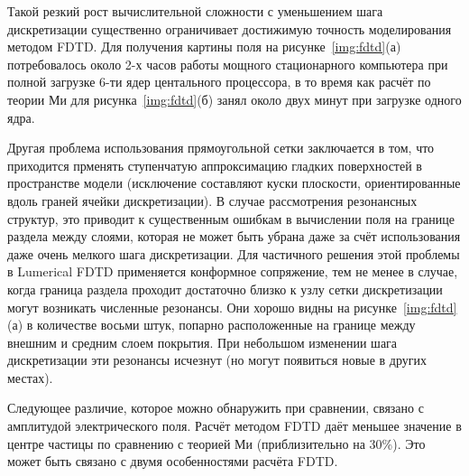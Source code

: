 Такой резкий рост вычислительной сложности с уменьшением шага
дискретизации существенно ограничивает достижимую точность
моделирования методом FDTD. Для получения картины поля на
рисунке~\ref{img:fdtd}(а) потребовалось около 2-х часов работы мощного
стационарного компьютера при полной загрузке 6-ти ядер центального
процессора, в то время как расчёт по теории Ми для
рисунка~\ref{img:fdtd}(б) занял около двух минут при загрузке одного
ядра.

Другая проблема использования прямоугольной сетки заключается в том,
что приходится прменять ступенчатую аппроксимацию гладких поверхностей
в пространстве модели (исключение составляют куски плоскости,
ориентированные вдоль граней ячейки дискретизации). В случае
рассмотрения резонансных структур, это приводит к существенным ошибкам
в вычислении поля на границе раздела между слоями, которая не может
быть убрана даже за счёт использования даже очень мелкого шага
дискретизации.  Для частичного решения этой проблемы в Lumerical FDTD
применяется конформное сопряжение, тем не менее в случае, когда
граница раздела проходит достаточно близко к узлу сетки дискретизации
могут возникать численные резонансы. Они хорошо видны на
рисунке~\ref{img:fdtd}(а) в количестве восьми штук, попарно
расположенные на границе между внешним и средним слоем покрытия. При
небольшом изменении шага дискретизации эти резонансы исчезнут (но
могут появиться новые в других местах).

Следующее различие, которое можно обнаружить при сравнении, связано с
амплитудой электрического поля.  Расчёт методом FDTD даёт меньшее
значение в центре частицы  по сравнению с теорией Ми (приблизительно
на 30\%).  Это может быть связано с двумя особенностями расчёта
FDTD.


